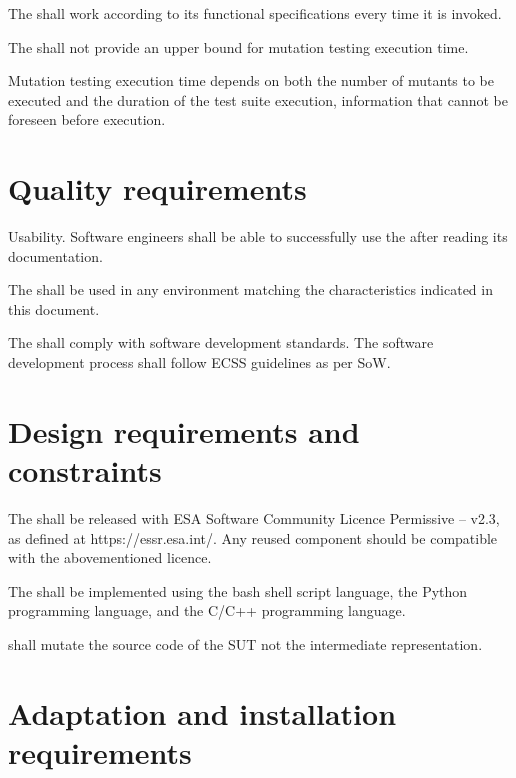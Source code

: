 \RQ{} The \FAQAS shall work according to its functional specifications every time it is invoked.


\RQ{} The \FAQAS shall not provide an upper bound for mutation testing execution time.

\remark Mutation testing execution time depends on both the number of mutants to be executed and the duration of the test suite execution, information that cannot be foreseen before execution.

\section{Quality requirements}

\RQ{} Usability. Software engineers shall be able to successfully use the \FAQAS after reading its documentation.

\RQ{} The \FAQAS shall be used in any environment matching the characteristics indicated in this document.

\RQ{} The \FAQAS shall comply with software development standards. The software development process shall follow ECSS guidelines as per SoW.


\section{Design requirements and constraints}

\RQ{} The \FAQAS shall be released with ESA Software Community Licence Permissive – v2.3, as defined at https://essr.esa.int/. Any reused component should be compatible with the abovementioned licence.

\RQ{} The \FAQAS shall be implemented using the bash shell script language, the Python programming language, and the C/C++ programming language.

\RQ{} \FAQAS shall mutate the source code of the SUT not the intermediate representation.


\section{Adaptation and installation requirements}



